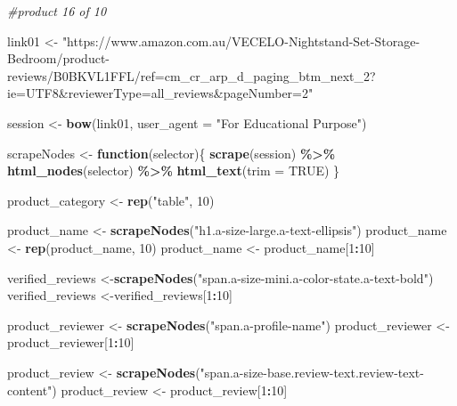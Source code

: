 \documentclass[
]{article}
\newenvironment{Shaded}{\begin{snugshade}}{\end{snugshade}}
\newcommand{\AttributeTok}[1]{\textcolor[rgb]{0.13,0.29,0.53}{#1}}
\newcommand{\CommentTok}[1]{\textcolor[rgb]{0.56,0.35,0.01}{\textit{#1}}}
\newcommand{\ConstantTok}[1]{\textcolor[rgb]{0.56,0.35,0.01}{#1}}
\newcommand{\ControlFlowTok}[1]{\textcolor[rgb]{0.13,0.29,0.53}{\textbf{#1}}}
\newcommand{\DecValTok}[1]{\textcolor[rgb]{0.00,0.00,0.81}{#1}}
\newcommand{\FunctionTok}[1]{\textcolor[rgb]{0.13,0.29,0.53}{\textbf{#1}}}
\newcommand{\NormalTok}[1]{#1}
\newcommand{\OtherTok}[1]{\textcolor[rgb]{0.56,0.35,0.01}{#1}}
\newcommand{\SpecialCharTok}[1]{\textcolor[rgb]{0.81,0.36,0.00}{\textbf{#1}}}
\newcommand{\StringTok}[1]{\textcolor[rgb]{0.31,0.60,0.02}{#1}}
\begin{document}
\begin{Shaded}
\begin{Highlighting}[]
\CommentTok{\#product 16 of 10}

\NormalTok{link01 }\OtherTok{\textless{}{-}} \StringTok{"https://www.amazon.com.au/VECELO{-}Nightstand{-}Set{-}Storage{-}Bedroom/product{-}reviews/B0BKVL1FFL/ref=cm\_cr\_arp\_d\_paging\_btm\_next\_2?ie=UTF8\&reviewerType=all\_reviews\&pageNumber=2"}


\NormalTok{  session }\OtherTok{\textless{}{-}} \FunctionTok{bow}\NormalTok{(link01,}
               \AttributeTok{user\_agent =} \StringTok{"For Educational Purpose"}\NormalTok{)}

\NormalTok{  scrapeNodes }\OtherTok{\textless{}{-}} \ControlFlowTok{function}\NormalTok{(selector)\{}
    \FunctionTok{scrape}\NormalTok{(session) }\SpecialCharTok{\%\textgreater{}\%}
      \FunctionTok{html\_nodes}\NormalTok{(selector) }\SpecialCharTok{\%\textgreater{}\%}
      \FunctionTok{html\_text}\NormalTok{(}\AttributeTok{trim =} \ConstantTok{TRUE}\NormalTok{)}
\NormalTok{  \}}

\NormalTok{  product\_category }\OtherTok{\textless{}{-}} \FunctionTok{rep}\NormalTok{(}\StringTok{"table"}\NormalTok{, }\DecValTok{10}\NormalTok{)}

\NormalTok{  product\_name }\OtherTok{\textless{}{-}} \FunctionTok{scrapeNodes}\NormalTok{(}\StringTok{"h1.a{-}size{-}large.a{-}text{-}ellipsis"}\NormalTok{)}
\NormalTok{  product\_name }\OtherTok{\textless{}{-}} \FunctionTok{rep}\NormalTok{(product\_name, }\DecValTok{10}\NormalTok{)}
\NormalTok{  product\_name }\OtherTok{\textless{}{-}}\NormalTok{ product\_name[}\DecValTok{1}\SpecialCharTok{:}\DecValTok{10}\NormalTok{]}
  
\NormalTok{  verified\_reviews }\OtherTok{\textless{}{-}}\FunctionTok{scrapeNodes}\NormalTok{(}\StringTok{"span.a{-}size{-}mini.a{-}color{-}state.a{-}text{-}bold"}\NormalTok{)}
\NormalTok{  verified\_reviews }\OtherTok{\textless{}{-}}\NormalTok{verified\_reviews[}\DecValTok{1}\SpecialCharTok{:}\DecValTok{10}\NormalTok{]}
  
\NormalTok{  product\_reviewer }\OtherTok{\textless{}{-}} \FunctionTok{scrapeNodes}\NormalTok{(}\StringTok{"span.a{-}profile{-}name"}\NormalTok{)}
\NormalTok{  product\_reviewer }\OtherTok{\textless{}{-}}\NormalTok{ product\_reviewer[}\DecValTok{1}\SpecialCharTok{:}\DecValTok{10}\NormalTok{]}
  
\NormalTok{  product\_review }\OtherTok{\textless{}{-}} \FunctionTok{scrapeNodes}\NormalTok{(}\StringTok{"span.a{-}size{-}base.review{-}text.review{-}text{-}content"}\NormalTok{)}
\NormalTok{  product\_review }\OtherTok{\textless{}{-}}\NormalTok{ product\_review[}\DecValTok{1}\SpecialCharTok{:}\DecValTok{10}\NormalTok{]}
  

\end{Highlighting}
\end{Shaded}
\end{document}
